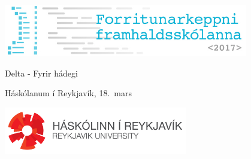 \documentclass[12pt,a4paper]{problemset}
\begin{document}
\begin{titlepage}
    \centering
    \includegraphics[width=0.8\textwidth]{fklogo}\\
    \vspace{1cm}
    {\Huge Delta - Fyrir hádegi \par}
    \vspace{0.5cm}
    {\LARGE Háskólanum í Reykjavík, 18.\ mars \par}
    \vspace{2cm}
    { \Huge \tableofcontents }
    \vfill
    \includegraphics[width=0.6\textwidth]{horizontal_white.png}
\end{titlepage}

\end{document}
